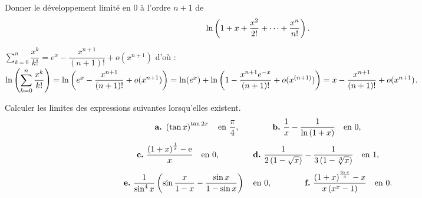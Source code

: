 \documentclass{magnolia}
\begin{document}
Donner le développement limité en 0 à l'ordre $n+1$ de
\[\ln\left(1+x+\frac{x^2}{2!}+\dots+\frac{x^n}{n!}\right).\]

\begin{sol}
$\displaystyle \sum_{k=0}^{n}\dfrac{x^k}{k!}=e^x-\dfrac{x^{n+1}}{(n+1)!}+o(x^{n+1})$ d'où :\\$\ln\left(
\displaystyle \sum_{k=0}^{n}\dfrac{x^k}{k!}\right)=\ln\left(e^x-\dfrac{x^{n+1}}{(n+1)!}+o(x^{n+1})\right)=\ln(e^x)+\ln\left(1-\dfrac{x^{n+1}e^{-x}}
{ (n+1)! }+o(x^{(n+1)})\right)=x-\dfrac{x^{n+1}}{(n+1)!}+o(x^{n+1})$.
\end{sol}


Calculer les limites des expressions suivantes lorsqu'elles existent.
\[\textbf{a.}\ \left(\tan x\right)^{\tan 2x} \quad \text{en $\frac{\pi}{4}$}, \qquad\qquad
\textbf{b.}\ \frac{1}{x}-\frac{1}{\ln\left(1+x\right)} \quad \text{en 0},\]
\[\textbf{c.}\ \frac{\p{1+x}^{\frac{1}{x}}-\e}{x} \quad \text{en 0}, \qquad\qquad
\textbf{d.}\ \frac{1}{2\p{1-\sqrt{x}}}-\frac{1}{3\p{1-\sqrt[3]{x}}} \quad \text{en 1},\]
\[\textbf{e.}\ \frac{1}{\sin^4 x}\p{\sin\frac{x}{1-x}-\frac{\sin x}{1-\sin x}}
  \quad\text{en 0}, \qquad\qquad
  \textbf{f.}\ \frac{\p{1+x}^{\frac{\ln x}{x}}-x}{x\p{x^x-1}} \quad \text{en 0}.\]
\end{document}
